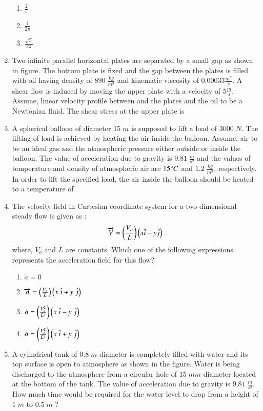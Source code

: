 \documentclass[journal,12pt,onecolumn]{IEEEtran}
\theoremstyle{remark}
\begin{document}
\begin{enumerate}[start=27]
\begin{enumerate}
    \item $\frac{2}{\pi}$
    \item $\frac{1}{2\pi}$
    \item $\frac{\sqrt{3}}{2\pi}$
\end{enumerate}
\item Two infinite parallel horizontal plates are separated by a small gap  as shown in figure. The bottom plate is fixed and the gap between the plates is filled with oil having density of $890\;\frac{kg}{m^3}$ and kinematic viscosity of $0.00033\frac{m^2}{s}$. A shear flow is induced by moving the upper plate with a velocity of $5 \frac{m}{s}$. Assume, linear velocity profile between and the plates and the oil to be a Newtonian fluid. The shear stress  at the upper plate is \underline{\hspace{2cm}}
	
\item A spherical balloon of diameter $15\;m$ is supposed to lift a load of $3000\;N$. The lifting of load is achieved by heating the air inside the balloon. Assume, air to be an ideal gas and the atmospheric pressure either outside or inside the balloon. The value of acceleration due to gravity is $9.81\;\frac{m}{s^2}$ and the values of temperature and density of atmospheric air are $15\degree C$ and $1.2\;\frac{kg}{m^3}$, respectively. In order to lift the specified load, the air inside the balloon should be heated to a temperature  of \underline{\hspace{2cm}} 
\item The velocity field in Cartesian coordinate system for a two-dimensional steady flow is given as : $$\overrightarrow{V}=\left(\frac{V_o}{L}\right)\left(x \hat{i}-y \hat{j}\right)$$ where, $V_o$ and $L$ are constants. Which one of the following expressions represents the acceleration field  for this flow?
\begin{enumerate}
    \item $\dot{a}=0$
    \item $\overrightarrow{a}=\left(\frac{V_o}{L}\right)\left(x\;\hat{i}+y\;\hat{j}\right)$
    \item $\dot{a}=\left(\frac{V_o^2}{L^2}\right)\left(x\;\hat{i}-y\;\hat{j}\right)$
    \item $\dot{a}=\left(\frac{V_o^2}{L^2}\right)\left(x\;\hat{i}+y\;\hat{j}\right)$
\end{enumerate}
\item A cylindrical tank of $0.8\;m$ diameter is completely filled with water and its top surface is open to atmosphere as shown in the figure. Water is being discharged to the atmosphere from a circular hole of $15\;mm$ diameter located at the bottom of the tank. The value of acceleration due to gravity is $9.81\;\frac{m}{s^2}$. How much time  would be required for the water level to drop from a height of $1\;m$ to $0.5\;m$ ?  

\end{enumerate}
\end{document}
